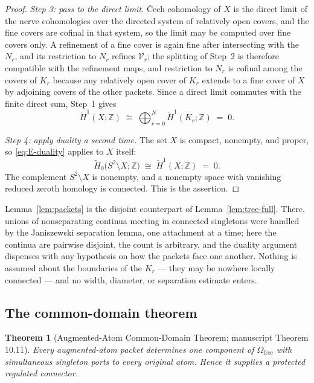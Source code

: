 \documentclass[11pt,reqno]{amsart}
\newtheorem{theorem}{Theorem}[section]
\theoremstyle{definition}
\theoremstyle{remark}
\newcommand{\Z}{\mathbb Z}
\newcommand{\Omfree}{\Omega_{\mathrm{free}}}
\begin{document}
\begin{proof}
\emph{Step 3: pass to the direct limit.}
\v{C}ech cohomology of $X$ is the direct limit of the nerve cohomologies over the
directed system of relatively open covers, and the fine covers are cofinal in that
system, so the limit may be computed over fine covers only. A refinement of a fine
cover is again fine after intersecting with the $N_r$, and its restriction to $N_r$
refines $\mathcal V_r$; the splitting of Step~2 is therefore compatible with the
refinement maps, and restriction to $N_r$ is cofinal among the covers of $K_r$
because any relatively open cover of $K_r$ extends to a fine cover of $X$ by
adjoining covers of the other packets. Since a direct limit commutes with the finite
direct sum, Step~1 gives
\[
\check H^1(X;\Z)\;\cong\;\bigoplus_{r=0}^{N}\check H^1(K_r;\Z)\;=\;0 .
\]

\emph{Step 4: apply duality a second time.}
The set $X$ is compact, nonempty, and proper, so \eqref{eq:E-duality} applies to $X$
itself:
\[
\widetilde H_0\bigl(S^2\setminus X;\Z\bigr)\;\cong\;\check H^1(X;\Z)\;=\;0 .
\]
The complement $S^2\setminus X$ is nonempty, and a nonempty space with vanishing
reduced zeroth homology is connected. This is the assertion.
\end{proof}

Lemma~\ref{lem:packets} is the disjoint counterpart of
Lemma~\ref{lem:tree-full}. There, unions of nonseparating continua meeting in
connected singletons were handled by the Janiszewski separation lemma, one attachment
at a time; here the continua are pairwise disjoint, the count is arbitrary, and the
duality argument dispenses with any hypothesis on how the packets face one another.
Nothing is assumed about the boundaries of the $K_r$ --- they may be nowhere locally
connected --- and no width, diameter, or separation estimate enters.

\subsection{The common-domain theorem}\label{subsec:E-common}

\begin{theorem}[Augmented-Atom Common-Domain Theorem; manuscript Theorem
10.11]\label{thm:common-domain}
Every augmented-atom packet determines one component of $\Omfree$ with simultaneous
singleton ports to every original atom. Hence it supplies a protected regulated
connector.
\end{theorem}
\end{document}
